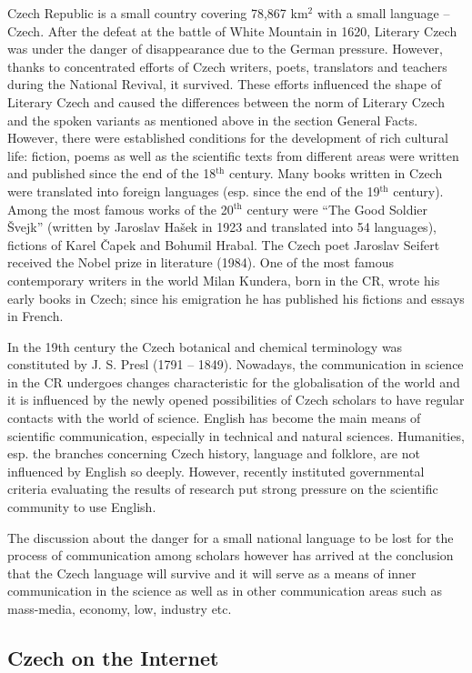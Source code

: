 \begin{multicols}{2}
Czech Republic is a small country covering 78,867 km$^{\textrm{2}}$ with a small language – Czech. After the defeat at the battle of White Mountain in 1620, Literary Czech was under the danger of disappearance due to the German pressure. However, thanks to concentrated efforts of Czech writers, poets, translators and teachers during the National Revival, it survived. These efforts influenced the shape of Literary Czech and caused the differences between the norm of Literary Czech and the spoken variants as mentioned above in the section General Facts. However, there were established conditions for the development of rich cultural life: fiction, poems as well as the scientific texts from different areas were written and published since the end of the 18$^{\textrm{th}}$ century. Many books written in Czech were translated into foreign languages (esp. since the end of the 19$^{\textrm{th}}$ century). Among the most famous works of the 20$^{\textrm{th}}$  century were “The Good Soldier Švejk” (written by Jaroslav Hašek in 1923 and translated into 54 languages), fictions of Karel Čapek and Bohumil Hrabal. The Czech poet Jaroslav Seifert received the Nobel prize in literature (1984). One of the most famous contemporary writers in the world Milan Kundera, born in the CR, wrote his early books in Czech; since his emigration he has published his fictions and essays in French.

In the 19th century the Czech botanical and chemical terminology was constituted by J. S. Presl (1791 – 1849). Nowadays, the communication in science in the CR undergoes changes characteristic for the globalisation of the world and it is influenced by the newly opened possibilities of Czech scholars to have regular contacts with the world of science. English has become the main means of scientific communication, especially in technical and natural sciences. Humanities, esp. the branches concerning Czech history, language  and folklore, are not influenced by English so deeply. However, recently instituted governmental criteria evaluating the results of research put strong pressure on the scientific community to use English.

The discussion about the danger for a small national language to be lost for the process of communication among scholars however has arrived at the conclusion that the Czech language will survive and it will serve as a means of inner communication in the science as well as in other communication areas such as mass-media, economy, low, industry etc.
  
\subsection{Czech on the Internet}


\end{multicols}

